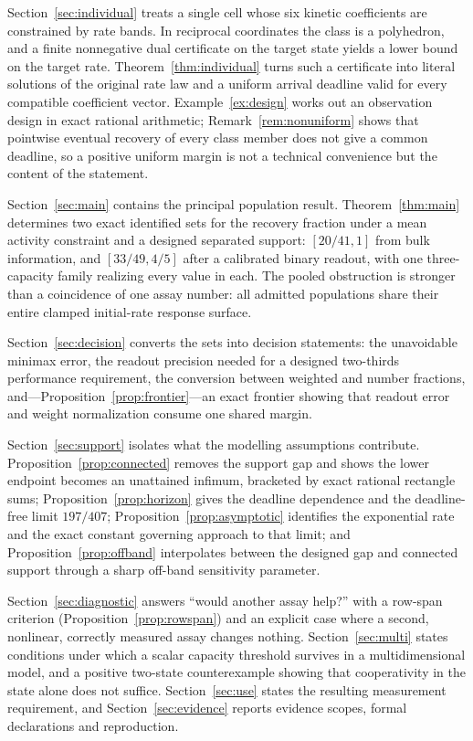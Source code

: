 \documentclass[11pt]{article}
\theoremstyle{definition}
\begin{document}
Section~\ref{sec:individual} treats a single cell whose six kinetic
coefficients are constrained by rate bands. In reciprocal coordinates the
class is a polyhedron, and a finite nonnegative dual certificate on the target
state yields a lower bound on the target rate. Theorem~\ref{thm:individual}
turns such a certificate into literal solutions of the original rate law and a
uniform arrival deadline valid for every compatible coefficient vector.
Example~\ref{ex:design} works out an observation design in exact rational
arithmetic; Remark~\ref{rem:nonuniform} shows that pointwise eventual recovery
of every class member does not give a common deadline, so a positive uniform
margin is not a technical convenience but the content of the statement.

Section~\ref{sec:main} contains the principal population result.
Theorem~\ref{thm:main} determines two exact identified sets for the recovery
fraction under a mean activity constraint and a designed separated support:
$[20/41,1]$ from bulk information, and $[33/49,4/5]$ after a calibrated binary
readout, with one three-capacity family realizing every value in each. The
pooled obstruction is stronger than a coincidence of one assay number: all
admitted populations share their entire clamped initial-rate response surface.

Section~\ref{sec:decision} converts the sets into decision statements: the
unavoidable minimax error, the readout precision needed for a designed
two-thirds performance requirement, the conversion between weighted and
number fractions, and---Proposition~\ref{prop:frontier}---an exact frontier
showing that readout error and weight normalization consume one shared margin.

Section~\ref{sec:support} isolates what the modelling assumptions contribute.
Proposition~\ref{prop:connected} removes the support gap and shows the lower
endpoint becomes an unattained infimum, bracketed by exact rational rectangle
sums; Proposition~\ref{prop:horizon} gives the deadline dependence and the
deadline-free limit $197/407$; Proposition~\ref{prop:asymptotic} identifies
the exponential rate and the exact constant governing approach to that limit;
and Proposition~\ref{prop:offband} interpolates between the designed gap and
connected support through a sharp off-band sensitivity parameter.

Section~\ref{sec:diagnostic} answers ``would another assay help?'' with a
row-span criterion (Proposition~\ref{prop:rowspan}) and an explicit case where
a second, nonlinear, correctly measured assay changes nothing.
Section~\ref{sec:multi} states conditions under which a scalar capacity
threshold survives in a multidimensional model, and a positive two-state
counterexample showing that cooperativity in the state alone does not suffice.
Section~\ref{sec:use} states the resulting measurement requirement, and
Section~\ref{sec:evidence} reports evidence scopes, formal declarations and
reproduction.
\end{document}
